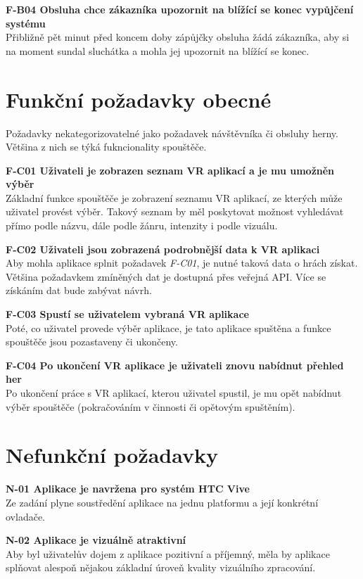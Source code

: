 \textbf{F-B04 Obsluha chce zákazníka upozornit na blížící se konec
vypůjčení systému}\\
Přibližně pět minut před koncem doby zápůjčky obsluha žádá zákazníka,
aby si na moment sundal sluchátka a mohla jej upozornit na blížící se
konec.

\section{Funkční požadavky
obecné}\label{funkux10dnuxed-poux17eadavky-obecnuxe9}

Požadavky nekategorizovatelné jako požadavek návštěvníka či obsluhy
herny. Většina z nich se týká fukncionality spouštěče.

\textbf{F-C01 Uživateli je zobrazen seznam VR aplikací a je mu umožněn
výběr}\\
Základní funkce spouštěče je zobrazení seznamu VR aplikací, ze kterých
může uživatel provést výběr. Takový seznam by měl poskytovat možnost
vyhledávat přímo podle názvu, dále podle žánru, intenzity i podle
vizuálu.

\textbf{F-C02 Uživateli jsou zobrazená podrobnější data k VR aplikaci}\\
Aby mohla aplikace splnit požadavek \emph{F-C01}, je nutné taková data o
hrách získat. Většina požadavkem zmíněných dat je dostupná přes veřejná
API. Více se získáním dat bude zabývat návrh.

\textbf{F-C03 Spustí se uživatelem vybraná VR aplikace}\\
Poté, co uživatel provede výběr aplikace, je tato aplikace spuštěna a
funkce spouštěče jsou pozastaveny či ukončeny.

\textbf{F-C04 Po ukončení VR aplikace je uživateli znovu nabídnut
přehled her}\\
Po ukončení práce s VR aplikací, kterou uživatel spustil, je mu opět
nabídnut výběr spouštěče (pokračováním v činnosti či opětovým
spuštěním).

\section{Nefunkční požadavky}\label{nefunkux10dnuxed-poux17eadavky}

\textbf{N-01 Aplikace je navržena pro systém HTC Vive}\\
Ze zadání plyne soustředění aplikace na jednu platformu a její konkrétní
ovladače.

\textbf{N-02 Aplikace je vizuálně atraktivní}\\
Aby byl uživatelův dojem z aplikace pozitivní a příjemný, měla by
aplikace splňovat alespoň nějakou základní úroveň kvality vizuálního
zpracování.

